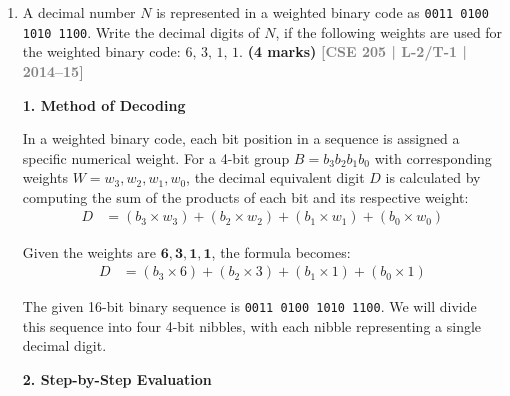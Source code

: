 \documentclass[12pt,a3paper]{article}
\newcommand{\yr}[1]{\hfill\textcolor{gray}{\small\textbf{[#1]}}}
\newcommand{\mk}[1]{\textcolor{orange!70!black}{\small\textbf{(#1 marks)}}}
\begin{document}
\begin{enumerate}
\begin{tcolorbox}[enhanced,breakable,ansbox,colback=cD!4,colframe=cD,boxrule=0.8pt,arc=5pt,title={\textbf{Answer}},fonttitle=\bfseries\color{white},colbacktitle=cD]
\vspace{1em}
\textbf{\textcolor{cD}{3. Final Result}}

Reading the generated integer parts from the first step down to the last step (top to bottom), we get the sequence $\mathbf{1}, \mathbf{0}, \mathbf{1}$.

\vspace{0.5em}
Therefore, the decimal fraction $(0.625)_{10}$ is exactly equal to the binary fraction:
\begin{align*}
    (0.625)_{10} &= (0.101)_{2}
\end{align*}

\end{tcolorbox}

\item A decimal number $N$ is represented in a weighted binary code as \texttt{0011 0100 1010 1100}. Write the decimal digits of $N$, if the following weights are used for the weighted binary code: $6,\,3,\,1,\,1$.
\mk{4} \yr{CSE 205 | L-2/T-1 | 2014--15}

\begin{tcolorbox}[enhanced,breakable,ansbox,colback=cD!4,colframe=cD,boxrule=0.8pt,arc=5pt,title={\textbf{Answer}},fonttitle=\bfseries\color{white},colbacktitle=cD]

\textbf{\textcolor{cD}{1. Method of Decoding}}

In a weighted binary code, each bit position in a sequence is assigned a specific numerical weight. For a 4-bit group $B = b_3b_2b_1b_0$ with corresponding weights $W = w_3, w_2, w_1, w_0$, the decimal equivalent digit $D$ is calculated by computing the sum of the products of each bit and its respective weight:
\begin{align*}
    D &= (b_3 \times w_3) + (b_2 \times w_2) + (b_1 \times w_1) + (b_0 \times w_0)
\end{align*}

Given the weights are $\mathbf{6, 3, 1, 1}$, the formula becomes:
\begin{align*}
    D &= (b_3 \times 6) + (b_2 \times 3) + (b_1 \times 1) + (b_0 \times 1)
\end{align*}

The given 16-bit binary sequence is \texttt{0011 0100 1010 1100}. We will divide this sequence into four 4-bit nibbles, with each nibble representing a single decimal digit.

\vspace{1em}
\textbf{\textcolor{cD}{2. Step-by-Step Evaluation}}


\end{tcolorbox}
\end{enumerate}
\end{document}
